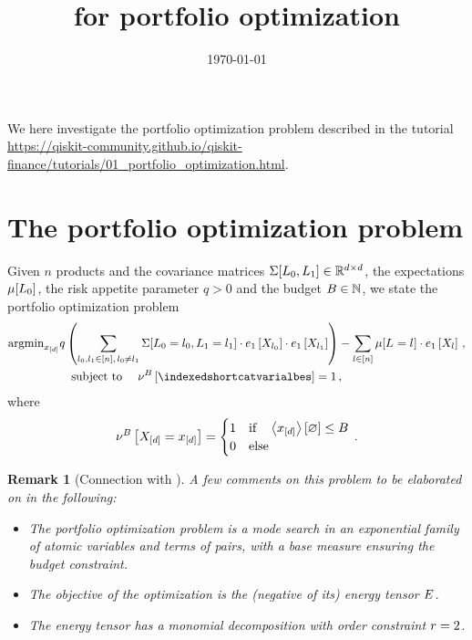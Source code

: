 \documentclass[aps,onecolumn,nofootinbib,pra]{article}
\newtheorem{remark}{Remark}
\begin{document}
    \title{\tnreason for portfolio optimization}

    \maketitle
    \date{\today}

    We here investigate the portfolio optimization problem described in the tutorial \url{https://qiskit-community.github.io/qiskit-finance/tutorials/01_portfolio_optimization.html}.


    \section{The portfolio optimization problem}

    \newcommand{\productsnum}{n}


    Given $\productsnum$ products and the covariance matrices $\Sigma[L_{0},L_{1}]\in\mathbb{R}^{d\times d}$, the expectations $\mu[L_{0}]$, the risk appetite parameter $q>0$ and the budget $B\in\mathbb{N}$, we state the portfolio optimization problem
    \begin{align}
        \argmin_{\shortcatindices} &
        q \left(\sum_{\selindexof{0},\selindexof{1}\in[\productsnum] , \, \selindexof{0}\neq\selindexof{1}}
        \Sigma[\indexedselvariableof{0},\indexedselvariableof{1}] \cdot \onehotmapofat{1}{\catvariableof{\selindexof{0}}}\cdot \onehotmapofat{1}{\catvariableof{\selindexof{1}}}\right)
        - \sum_{\selindex\in[\productsnum]} \mu[\indexedselvariable] \cdot \onehotmapofat{1}{\catvariableof{\selindex}} \, , \\
        & \quad \text{subject to } \quad \basemeasureofat{B}{\indexedshortcatvarialbes} = 1 \, ,%
    \end{align}
    where
    \begin{align*}
        \nu^{B}\left[X_{[d]}=x_{[d]}\right] =
        \begin{cases}
            1 & \text{if} \quad \left\langle x_{[d]}\right\rangle \left[ \varnothing \right] \leq B \\
            0 & \text{else}
        \end{cases} \, .
    \end{align*}

    \begin{remark}[Connection with \tnreason]
        A few comments on this problem to be elaborated on in the following:
        \begin{itemize}
            \item  The portfolio optimization problem is a mode search in an exponential family of atomic variables and terms of pairs, with a base measure ensuring the budget constraint.
            \item The objective of the optimization is the (negative of its) energy tensor $E$.
            \item The energy tensor has a monomial decomposition with order constraint $r=2$.
        \end{itemize}
    \end{remark}
\end{document}
